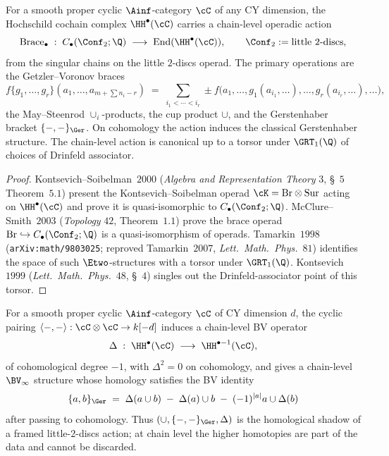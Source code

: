 \begin{proposition}
\label{prop:cy3-braces-action}
For a smooth proper cyclic $\Ainf$-category $\cC$ of any CY dimension,
the Hochschild cochain complex $\HH^\bullet(\cC)$ carries a chain-level
operadic action
\[
\mathrm{Brace}_\bullet\;:\;C_\bullet(\Conf_2;\Q)\;\longrightarrow\;\mathrm{End}(\HH^\bullet(\cC)),
\qquad \Conf_2:=\text{little $2$-discs},
\]
from the singular chains on the little $2$-discs operad. The primary
operations are the Getzler--Voronov braces
\[
f\{g_1,\ldots,g_r\}(a_1,\ldots,a_{m+\sum n_i - r})
\;=\;\sum_{i_1<\cdots<i_r}\pm
f\bigl(a_1,\ldots,g_1(a_{i_1},\ldots),\ldots,g_r(a_{i_r},\ldots),\ldots\bigr),
\]
the May--Steenrod $\cup_i$-products, the cup product $\cup$, and the
Gerstenhaber bracket $\{-,-\}_\Ger$. On cohomology the action induces
the classical Gerstenhaber structure. The chain-level action is
canonical up to a torsor under $\GRT_1(\Q)$ of choices of Drinfeld
associator.
\end{proposition}

\begin{proof}
Kontsevich--Soibelman~$2000$ (\emph{Algebra and Representation Theory}
$3$, \S~$5$ Theorem~$5.1$) present the Kontsevich--Soibelman operad
$\cK=\mathrm{Br}\otimes\mathrm{Sur}$ acting on $\HH^\bullet(\cC)$ and prove it is
quasi-isomorphic to $C_\bullet(\Conf_2;\Q)$. McClure--Smith~$2003$
(\emph{Topology} $42$, Theorem~$1.1$) prove the brace operad
$\mathrm{Br}\hookrightarrow C_\bullet(\Conf_2;\Q)$ is a quasi-isomorphism of
operads. Tamarkin~$1998$ (\texttt{arXiv:math/9803025}; reproved
Tamarkin~$2007$, \emph{Lett.\ Math.\ Phys.}~$81$) identifies the space
of such $\Etwo$-structures with a torsor under $\GRT_1(\Q)$.
Kontsevich~$1999$ (\emph{Lett.\ Math.\ Phys.}~$48$, \S~$4$) singles
out the Drinfeld-associator point of this torsor.
\end{proof}

\begin{proposition}
\label{prop:cy3-tmg-bv}
For a smooth proper cyclic $\Ainf$-category $\cC$ of CY dimension $d$,
the cyclic pairing $\langle-,-\rangle:\cC\otimes\cC\to k[-d]$ induces
a chain-level BV operator
\[
\Delta\;:\;\HH^\bullet(\cC)\;\longrightarrow\;\HH^{\bullet-1}(\cC),
\]
of cohomological degree $-1$, with $\Delta^2=0$ on cohomology,
and gives a chain-level $\BV_\infty$ structure whose homology satisfies
the BV identity
\[
\{a,b\}_\Ger\;=\;\Delta(a\cup b)\;-\;\Delta(a)\cup b
\;-\;(-1)^{|a|}a\cup\Delta(b)
\]
after passing to cohomology. Thus $(\cup,\{-,-\}_\Ger,\Delta)$ is the
homological shadow of a framed little-$2$-discs action; at chain level
the higher homotopies are part of the data and cannot be discarded.
\end{proposition}

